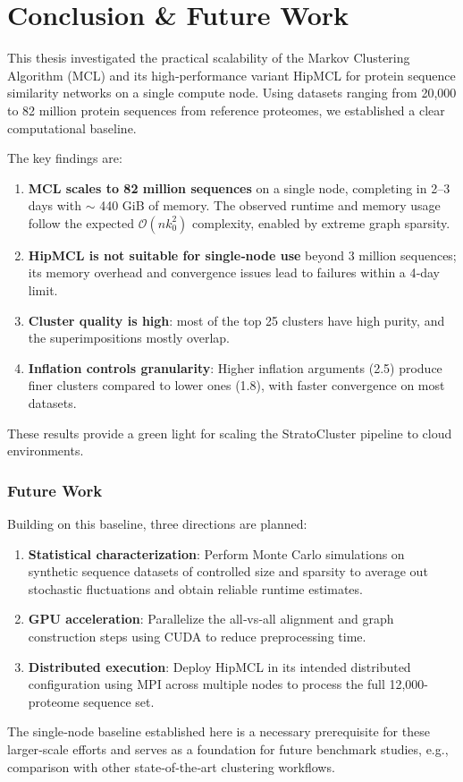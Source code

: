 \section[Conclusion \& \ Future Work]{Conclusion \& Future Work}

This thesis investigated the practical scalability of the Markov Clustering
Algorithm (MCL) and its high‑performance variant HipMCL for protein sequence
similarity networks on a single compute node. Using datasets ranging from
20,000 to 82 million protein sequences from reference proteomes, we established
a clear computational baseline.

The key findings are:

\begin{enumerate}
  \item \textbf{MCL scales to 82 million sequences} on a single node, completing in 2–3 days with \(\sim\) 440 GiB of memory. The observed runtime and memory usage follow the expected \(\mathcal{O}(n k_0^2)\) complexity, enabled by extreme graph sparsity.
  \item \textbf{HipMCL is not suitable for single‑node use} beyond 3 million sequences; its memory overhead and convergence issues lead to failures within a 4‑day limit.
  \item \textbf{Cluster quality is high}: most of the top 25 clusters have high purity, and the superimpositions mostly overlap.
  \item \textbf{Inflation controls granularity}: Higher inflation arguments (2.5) produce finer clusters compared to lower ones (1.8), with faster convergence on most datasets.
\end{enumerate}

These results provide a green light for scaling the StratoCluster pipeline to cloud environments.

\subsubsection*{Future Work}

Building on this baseline, three directions are planned:

\begin{enumerate}
  \item \textbf{Statistical characterization}: Perform Monte Carlo simulations on synthetic sequence datasets of controlled size and sparsity to average out stochastic fluctuations and obtain reliable runtime estimates.
  \item \textbf{GPU acceleration}: Parallelize the all‑vs‑all alignment and graph construction steps using CUDA to reduce preprocessing time.
  \item \textbf{Distributed execution}: Deploy HipMCL in its intended distributed configuration using MPI across multiple nodes to process the full 12,000-proteome sequence set.
\end{enumerate}

The single‑node baseline established here is a necessary prerequisite for these
larger‑scale efforts and serves as a foundation for future benchmark studies,
e.g., comparison with other state‑of‑the‑art clustering workflows.
